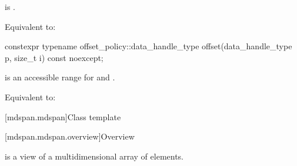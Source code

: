 \begin{itemdescr}
\pnum
\constraints
{}
is .

\pnum
\effects
Equivalent to: 
\end{itemdescr}

%
\begin{itemdecl}
constexpr typename offset_policy::data_handle_type
  offset(data_handle_type p, size_t i) const noexcept;
\end{itemdecl}

\begin{itemdescr}
\pnum
\expects
{} is an accessible range for  and .

\pnum
\effects
Equivalent to: 
\end{itemdescr}

[mdspan.mdspan]{Class template }

[mdspan.mdspan.overview]{Overview}

\pnum
{} is a view of a multidimensional array of elements.

